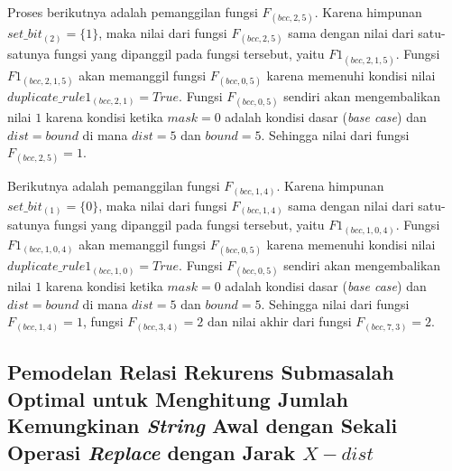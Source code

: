 Proses berikutnya adalah pemanggilan fungsi $ F_{(bcc, 2, 5)} $. Karena himpunan $ set\_bit_{(2)} = \{1\} $, maka nilai dari fungsi $ F_{(bcc, 2, 5)} $ sama dengan nilai dari satu-satunya fungsi yang dipanggil pada fungsi tersebut, yaitu $ F1_{(bcc, 2, 1, 5)} $. Fungsi $ F1_{(bcc, 2, 1, 5)} $ akan memanggil fungsi $ F_{(bcc, 0, 5)} $ karena memenuhi kondisi nilai $ duplicate\_rule1_{(bcc, 2, 1)} = True$. Fungsi $ F_{(bcc, 0, 5)} $ sendiri akan mengembalikan nilai $ 1 $ karena kondisi ketika $ mask = 0 $ adalah kondisi dasar (\textit{base case}) dan $ dist = bound$ di mana $ dist = 5$ dan $ bound=5 $. Sehingga nilai dari fungsi $ F_{(bcc, 2, 5)} =1$.

Berikutnya adalah pemanggilan fungsi $ F_{(bcc, 1, 4)} $. Karena himpunan $ set\_bit_{(1)} = \{0\} $, maka nilai dari fungsi $ F_{(bcc, 1, 4)} $ sama dengan nilai dari satu-satunya fungsi yang dipanggil pada fungsi tersebut, yaitu $ F1_{(bcc, 1, 0, 4)} $. Fungsi $ F1_{(bcc, 1, 0, 4)} $ akan memanggil fungsi $ F_{(bcc, 0, 5)} $ karena memenuhi kondisi nilai $ duplicate\_rule1_{(bcc, 1, 0)} = True$. Fungsi $ F_{(bcc, 0, 5)} $ sendiri akan mengembalikan nilai $ 1 $ karena kondisi ketika $ mask = 0 $ adalah kondisi dasar (\textit{base case}) dan $ dist = bound$ di mana $ dist = 5$ dan $ bound=5 $. Sehingga nilai dari fungsi $ F_{(bcc, 1, 4)} =1$, fungsi $ F_{(bcc, 3, 4)} =2$ dan nilai akhir dari fungsi $ F_{(bcc, 7, 3)} =2$.

\subsection{Pemodelan Relasi Rekurens Submasalah Optimal untuk Menghitung Jumlah Kemungkinan \textit{String} Awal dengan Sekali Operasi \textit{Replace} dengan Jarak $X-dist$}
\label{subsec:pemodelan_relasi_rekurens_submasalah_optimal_untuk_menghitung_jumlah_kemungkinan_string_awal_dengan_operasi_replace}

